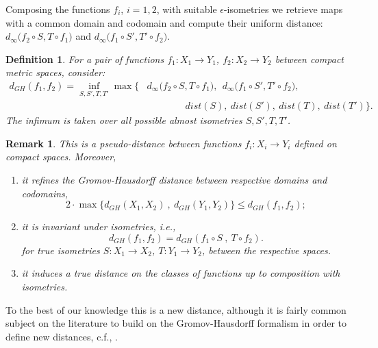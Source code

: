 \documentclass[11pt]{article}
\newtheorem{defn}[thm]{Definition}
\newtheorem{rem}[thm]{Remark}
\begin{document}
Composing the functions $f_i$, $i=1,2$, with suitable $\epsilon$-isometries we retrieve maps with a common domain and codomain and compute their uniform distance: 
$ d_{\infty}\big(f_2\circ S, T \circ f_1 \big)$  and $d_{\infty}\big(f_1\circ S',T' \circ f_2\big)$.

\begin{defn} 
For a pair of functions $f_1:X_1\to Y_1$, $f_2:X_2\to Y_2$ between compact metric spaces, consider:
\[
\begin{array}{ll}
d_{GH}(f_1,f_2) =  \underset{S,S',T,T'}{\inf} \max\Big\{&   
d_{\infty}\big(f_2\circ S, T \circ f_1 \big),~~ d_{\infty}\big(f_1\circ S',T' \circ f_2\big), \\
&\qquad\qquad  dist(S),~dist(S'),~dist(T),~dist(T')      \Big\} .
\end{array} \]
The infimum is taken over all possible almost isometries $S,S',T,T'$.
\end{defn}


\begin{rem} This is a pseudo-distance between functions $f_i:X_i\to Y_i$ defined on compact spaces. Moreover,
\begin{enumerate}

    \item it refines the Gromov-Hausdorff distance between respective domains and codomains, 
    \[  2\cdot \max \{   d_{GH}(X_1,X_2)~,~ d_{GH}(Y_1,Y_2)\} \leq d_{GH}(f_1,f_2) ;\]
  

    \item it is invariant under isometries, i.e., 
 \[ d_{GH}(f_1,f_2)= d_{GH}(f_1\circ S~,~T \circ f_2).\]
for true isometries $S:X_1\to X_2$, $T:Y_1\to Y_2$, between the respective spaces.
  
\item it induces a true distance on the classes of functions up to composition with isometries. 
\end{enumerate}
\end{rem}

To the best of our knowledge this is a new distance, although it is fairly common subject on the literature to build on the Gromov-Hausdorff formalism in order to define new distances, c.f., \cite{khezeli2023unified}. 
\end{document}
